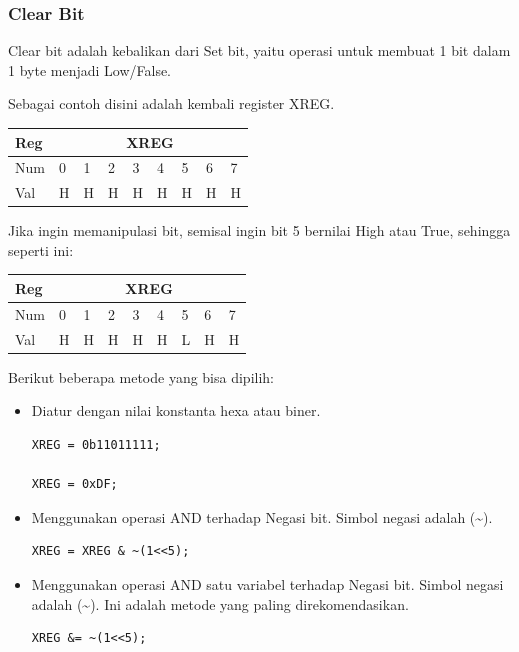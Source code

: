 \documentclass[12pt,]{article}
\begin{document}
	\subsubsection{Clear Bit}

	Clear bit adalah kebalikan dari Set bit, yaitu operasi untuk membuat 1 bit dalam 1 byte menjadi Low/False.

	Sebagai contoh disini adalah kembali register XREG.

	\begin{table}[H]
		\begin{tabular}{|l|l|l|l|l|l|l|l|l|}
			\hline
			Reg & \multicolumn{8}{c|}{XREG}     \\ \hline
			Num & 0 & 1 & 2 & 3 & 4 & 5 & 6 & 7 \\ \hline
			Val & H & H & H & H & H & H & H & H \\ \hline
		\end{tabular}
	\end{table}

	Jika ingin memanipulasi bit, semisal ingin bit 5 bernilai High atau True, sehingga seperti ini:
	\begin{table}[H]
		\begin{tabular}{|l|l|l|l|l|l|l|l|l|}
			\hline
			Reg & \multicolumn{8}{c|}{XREG}     \\ \hline
			Num & 0 & 1 & 2 & 3 & 4 & 5 & 6 & 7 \\ \hline
			Val & H & H & H & H & H & L & H & H \\ \hline
		\end{tabular}
	\end{table}

	Berikut beberapa metode yang bisa dipilih:
	\begin{itemize}
		\item Diatur dengan nilai konstanta hexa atau biner.
		\begin{verbatim}
XREG = 0b11011111;

XREG = 0xDF;
		\end{verbatim}

		\item Menggunakan operasi AND terhadap Negasi bit.
		Simbol negasi adalah (\textasciitilde).
		\begin{verbatim}
XREG = XREG & ~(1<<5);
		\end{verbatim}

		\item Menggunakan operasi AND satu variabel terhadap Negasi bit.
		Simbol negasi adalah (\textasciitilde).
		Ini adalah metode yang paling direkomendasikan.
		\begin{verbatim}
XREG &= ~(1<<5);
		\end{verbatim}
	\end{itemize}
\end{document}
